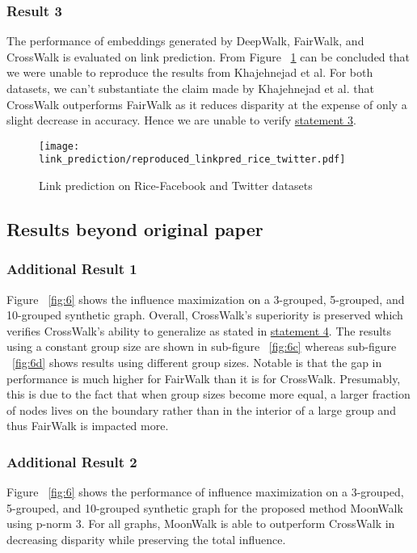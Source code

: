 \subsubsection{Result 3}

The performance of embeddings generated by DeepWalk, FairWalk, and CrossWalk is evaluated on link prediction. From Figure ~\ref{fig:linkpred} can be concluded that we were unable to reproduce the results from Khajehnejad et al. For both datasets, we can't substantiate the claim made by Khajehnejad et al. that CrossWalk outperforms FairWalk as it reduces disparity at the expense of only a slight decrease in accuracy. Hence we are unable to verify \hyperref[claim3]{statement 3}.

\begin{figure}[H]
    \centering
    \texttt{[image: link\_prediction/reproduced\_linkpred\_rice\_twitter.pdf]}
    \caption{Link prediction on Rice-Facebook and Twitter datasets}
    \label{fig:linkpred}
\end{figure}

\subsection{Results beyond original paper}
 
\subsubsection{Additional Result 1}
Figure ~\ref{fig:6} shows the influence maximization on a 3-grouped, 5-grouped, and  10-grouped synthetic graph. Overall, CrossWalk's superiority is preserved which verifies CrossWalk's ability to generalize as stated in \hyperref[claim4]{statement 4}. The results using a constant group size are shown in sub-figure ~\ref{fig:6c} whereas sub-figure ~\ref{fig:6d} shows results using different group sizes. Notable is that the gap in performance is much higher for FairWalk than it is for CrossWalk. Presumably, this is due to the fact that when group sizes become more equal, a larger fraction of nodes lives on the boundary rather than in the interior of a large group and thus FairWalk is impacted more.

\subsubsection{Additional Result 2}
Figure ~\ref{fig:6} shows the performance of influence maximization on a 3-grouped, 5-grouped, and 10-grouped synthetic graph for the proposed method MoonWalk using p-norm 3. For all graphs, MoonWalk is able to outperform CrossWalk in decreasing disparity while preserving the total influence. 

